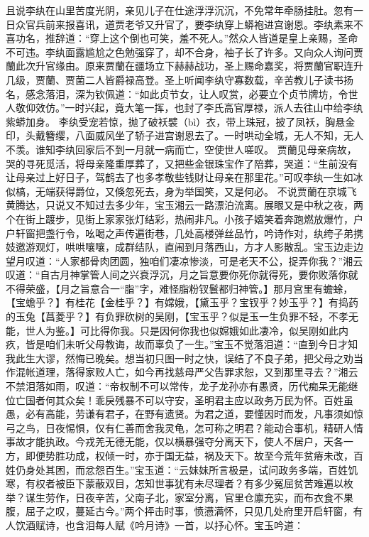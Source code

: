 \documentclass[12pt,oneside]{book}
\begin{document}
且说李纨在山里苦度光阴，亲见儿子在仕途浮浮沉沉，不免常年牵肠挂肚。忽有一日众官兵前来报喜讯，道贾老爷又升官了，要李纨穿上蟒袍进宫谢恩。李纨素来不喜功名，推辞道：“穿上这个倒也可笑，羞不死人。”然众人皆道是皇上亲赐，圣命不可违。李纨面露尴尬之色勉强穿了，却不合身，袖子长了许多。又向众人询问贾蘭此次升官缘由。原来贾蘭在疆场立下赫赫战功，圣上赐命嘉奖，将贾蘭官职连升几级，贾蘭、贾菌二人皆爵禄高登。圣上听闻李纨守寡数载，辛苦教儿子读书扬名，感念落泪，深为钦佩道：“如此贞节女，让人叹赏，必要立个贞节牌坊，令世人敬仰效仿。”一时兴起，竟大笔一挥，也封了李氏高官厚禄，派人去往山中给李纨紫蟒加身。
李纨受宠若惊，抛了破袄襞（bì）衣，带上珠冠，披了凤袄，胸悬金印，头戴簪缨，八面威风坐了轿子进宫谢恩去了。一时哄动全城，无人不知，无人不羡。谁知李纨回家后不到一月就一病而亡，空使世人嗟叹。
贾蘭见母亲病故，哭的寻死觅活，将母亲隆重厚葬了，又把些金银珠宝作了陪葬，哭道：“生前没有让母亲过上好日子，驾鹤去了也多孝敬些钱财让母亲在那里花。”可叹李纨一生如冰似槁，无端获得爵位，又倏忽死去，身为举国笑，又是何必。
不说贾蘭在京城飞黄腾达，只说又不知过去多少年，宝玉湘云一路漂泊流离。展眼又是中秋之夜，两个在街上踱步，见街上家家张灯结彩，热闹非凡。小孩子嬉笑着奔跑燃放爆竹，户户轩窗把盏行令，吆喝之声传遍街巷，几处高楼弹丝品竹，吟诗作对，纨绔子弟携妓邀游观灯，哄哄嚷嚷，成群结队，直闹到月落西山，方才人影散乱。宝玉边走边望月叹道：“人家都骨肉团圆，独咱们凄凉惨淡，可是老天不公，捉弄你我？”湘云叹道：“自古月神掌管人间之兴衰浮沉，月之旨意要你死你就得死，要你败落你就不得荣盛，【月之旨意合一“脂”字，难怪脂粉钗鬟都归神管。】那月宫里有蟾蜍，【宝蟾乎？】有桂花【金桂乎？】有嫦娥，【黛玉乎？宝钗乎？妙玉乎？】有捣药的玉兔【菖菱乎？】有负罪砍树的吴刚，【宝玉乎？似是玉一生负罪不轻，不孝无能，世人为鉴。】可比得你我。只是因何你我也似嫦娥如此凄冷，似吴刚如此内疚，皆是咱们未听父母教诲，故而辜负了一生。”宝玉不觉落泪道：“直到今日才知我此生大谬，然悔已晚矣。想当初只图一时之快，误结了不良子弟，把父母之劝当作混帐道理，落得家败人亡，如今再找慈母严父告罪求恕，又到那里寻去？”湘云不禁泪落如雨，叹道：“帝权制不可以常传，龙子龙孙亦有愚贤，历代痴呆无能继位亡国者何其众矣！乖戾残暴不可以守安，圣明君主应以政务万民为怀。百姓虽愚，必有高能，劳谦有君子，在野有遗贤。为君之道，要懂因时而发，凡事须如惊弓之鸟，日夜惕惧，仅有仁善而舍我灵龟，怎可称之明君？能动合事机，精研人情事故才能执政。今戎羌无德无能，仅以横暴强夺分离天下，使人不居户，天各一方，即便势胜功成，权倾一时，亦于国无益，祸及天下。故至今荒年贫瘠未改，百姓仍身处其困，而忿怨百生。”宝玉道：“云妹妹所言极是，试问政务多端，百姓饥寒，有权者被臣下蒙蔽双目，怎知世事犹有未尽理者？有多少冤屈贫苦难遍以枚举？谋生劳作，日夜辛苦，父南子北，家室分离，官里仓廪充实，而布衣食不果腹，屈子之叹，蔓延古今。”两个抨击时事，愤懑满怀，只见几处府里开启轩窗，有人饮酒赋诗，也含泪每人赋《吟月诗》一首，以抒心怀。宝玉吟道：
\end{document}
